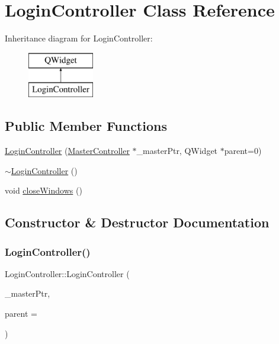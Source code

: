 \hypertarget{class_login_controller}{}\section{Login\+Controller Class Reference}
\label{class_login_controller}
Inheritance diagram for Login\+Controller\+:\begin{figure}[H]
\begin{center}
\leavevmode
\includegraphics[height=2.000000cm]{class_login_controller}
\end{center}
\end{figure}
\subsection*{Public Member Functions}
\begin{DoxyCompactItemize}
\item 
\mbox{\hyperlink{class_login_controller_a3591281520e6cfea2bc3af44bdef58e3}{Login\+Controller}} (\mbox{\hyperlink{class_master_controller}{Master\+Controller}} $\ast$\+\_\+master\+Ptr, Q\+Widget $\ast$parent=0)
\item 
\mbox{\hyperlink{class_login_controller_ab1dfb02e0f9f71d7d7c8d225a8cad568}{$\sim$\+Login\+Controller}} ()
\item 
void \mbox{\hyperlink{class_login_controller_a358f161325a516457b19cbd610805b7a}{close\+Windows}} ()
\end{DoxyCompactItemize}


\subsection{Constructor \& Destructor Documentation}
\mbox{\label{class_login_controller_a3591281520e6cfea2bc3af44bdef58e3}} 
\subsubsection{\texorpdfstring{Login\+Controller()}{LoginController()}}
{\footnotesize\ttfamily Login\+Controller\+::\+Login\+Controller (\begin{DoxyParamCaption}\item[{\mbox{\hyperlink{class_master_controller}{Master\+Controller}} $\ast$}]{\+\_\+master\+Ptr,  }\item[{Q\+Widget $\ast$}]{parent = {} }\end{DoxyParamCaption})}

